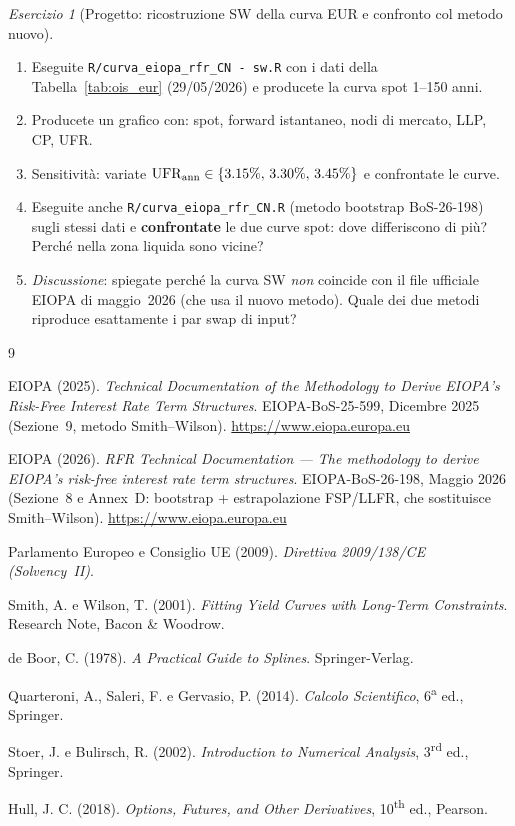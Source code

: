\documentclass[11pt,a4paper]{article}
\theoremstyle{plain}
\theoremstyle{definition}
\theoremstyle{remark}
\newtheorem{esercizio}{Esercizio}[section]
\newcommand{\UFR}{\ensuremath{\mathrm{UFR}}}
\begin{document}
\begin{esercizio}[Progetto: ricostruzione SW della curva EUR e confronto col metodo nuovo]
\begin{enumerate}[label=(\alph*)]
  \item Eseguite \texttt{R/curva\_eiopa\_rfr\_CN\ -\ sw.R} con i dati della
        Tabella~\ref{tab:ois_eur} (29/05/2026) e producete la curva spot 1--150 anni.
  \item Producete un grafico con: spot, forward istantaneo, nodi di mercato, LLP, CP, UFR.
  \item Sensitivit\`a: variate $\UFR_{\rm ann} \in \{3.15\%,\,3.30\%,\,3.45\%\}$ e
        confrontate le curve.
  \item Eseguite anche \texttt{R/curva\_eiopa\_rfr\_CN.R} (metodo bootstrap BoS-26-198)
        sugli stessi dati e \textbf{confrontate} le due curve spot: dove differiscono
        di più? Perché nella zona liquida sono vicine?
  \item \emph{Discussione}: spiegate perché la curva SW \emph{non} coincide con il file
        ufficiale EIOPA di maggio~2026 (che usa il nuovo metodo). Quale dei due metodi
        riproduce esattamente i par swap di input?
\end{enumerate}
\end{esercizio}

\renewcommand{\refname}{Riferimenti bibliografici}
\begin{thebibliography}{9}

EIOPA (2025).
\textit{Technical Documentation of the Methodology to Derive EIOPA's
Risk-Free Interest Rate Term Structures}.
EIOPA-BoS-25-599, Dicembre 2025 (Sezione~9, metodo Smith--Wilson).
\url{https://www.eiopa.europa.eu}

EIOPA (2026).
\textit{RFR Technical Documentation --- The methodology to derive EIOPA's
risk-free interest rate term structures}.
EIOPA-BoS-26-198, Maggio 2026 (Sezione~8 e Annex~D: bootstrap + estrapolazione
FSP/LLFR, che sostituisce Smith--Wilson).
\url{https://www.eiopa.europa.eu}

Parlamento Europeo e Consiglio UE (2009).
\textit{Direttiva 2009/138/CE (Solvency~II)}.

Smith, A. e Wilson, T. (2001).
\textit{Fitting Yield Curves with Long-Term Constraints}.
Research Note, Bacon \& Woodrow.

de Boor, C. (1978).
\textit{A Practical Guide to Splines}.
Springer-Verlag.

Quarteroni, A., Saleri, F. e Gervasio, P. (2014).
\textit{Calcolo Scientifico}, 6\textsuperscript{a} ed., Springer.

Stoer, J. e Bulirsch, R. (2002).
\textit{Introduction to Numerical Analysis}, 3\textsuperscript{rd} ed., Springer.

Hull, J. C. (2018).
\textit{Options, Futures, and Other Derivatives}, 10\textsuperscript{th} ed., Pearson.

\end{thebibliography}
\end{document}
